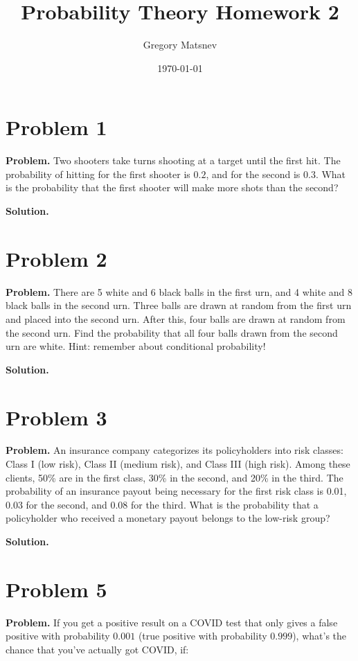 \documentclass{article}
\title{Probability Theory Homework 2}
\author{Gregory Matsnev}
\date{\today}
\begin{document}
\maketitle

\section{Problem 1}

\textbf{Problem.} Two shooters take turns shooting at a target until the first hit. The probability of hitting for the first shooter is $0.2$, and for the second is $0.3$. What is the probability that the first shooter will make more shots than the second?

\textbf{Solution.} 

\section{Problem 2}

\textbf{Problem.} There are 5 white and 6 black balls in the first urn, and 4 white and 8 black balls in the second urn. Three balls are drawn at random from the first urn and placed into the second urn. After this, four balls are drawn at random from the second urn. Find the probability that all four balls drawn from the second urn are white. Hint: remember about conditional probability!

\textbf{Solution.} 

\section{Problem 3}

\textbf{Problem.} An insurance company categorizes its policyholders into risk classes: Class I (low risk), Class II (medium risk), and Class III (high risk). Among these clients, 50\% are in the first class, 30\% in the second, and 20\% in the third. The probability of an insurance payout being necessary for the first risk class is 0.01, 0.03 for the second, and 0.08 for the third. What is the probability that a policyholder who received a monetary payout belongs to the low-risk group?

\textbf{Solution.} 

\section{Problem 5}

\textbf{Problem.} If you get a positive result on a COVID test that only gives a false positive with probability \( 0.001 \) (true positive with probability \( 0.999 \)), what’s the chance that you’ve actually got COVID, if:
\end{document}
